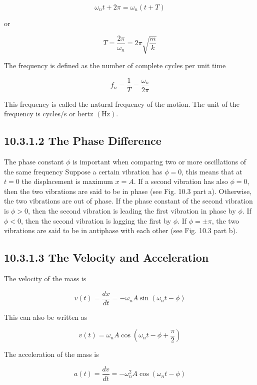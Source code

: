 \documentclass[10pt]{article}
\begin{document}
$$
\omega_{n} t+2 \pi=\omega_{n}(t+T)
$$

or

$$
T=\frac{2 \pi}{\omega_{n}}=2 \pi \sqrt{\frac{m}{k}}
$$

The frequency is defined as the number of complete cycles per unit time

$$
f_{n}=\frac{1}{T}=\frac{\omega_{n}}{2 \pi}
$$

This frequency is called the natural frequency of the motion. The unit of the frequency is cycles/s or hertz $(\mathrm{Hz})$.

\subsection*{10.3.1.2 The Phase Difference}
The phase constant $\phi$ is important when comparing two or more oscillations of the same frequency Suppose a certain vibration has $\phi=0$, this means that at $t=0$ the displacement is maximum $x=A$. If a second vibration has also $\phi=0$, then the two vibrations are said to be in phase (see Fig. 10.3 part a). Otherwise, the two vibrations are out of phase. If the phase constant of the second vibration is $\phi>0$, then the second vibration is leading the first vibration in phase by $\phi$. If $\phi<0$, then the second vibration is lagging the first by $\phi$. If $\phi= \pm \pi$, the two vibrations are said to be in antiphase with each other (see Fig. 10.3 part b).

\subsection*{10.3.1.3 The Velocity and Acceleration}
The velocity of the mass is


\begin{equation*}
v(t)=\frac{d x}{d t}=-\omega_{n} A \sin \left(\omega_{n} t-\phi\right) \tag{10.4}
\end{equation*}


This can also be written as


\begin{equation*}
v(t)=\omega_{n} A \cos \left(\omega_{n} t-\phi+\frac{\pi}{2}\right) \tag{10.5}
\end{equation*}


The acceleration of the mass is


\begin{equation*}
a(t)=\frac{d v}{d t}=-\omega_{n}^{2} A \cos \left(\omega_{n} t-\phi\right) \tag{10.6}
\end{equation*}
\end{document}

